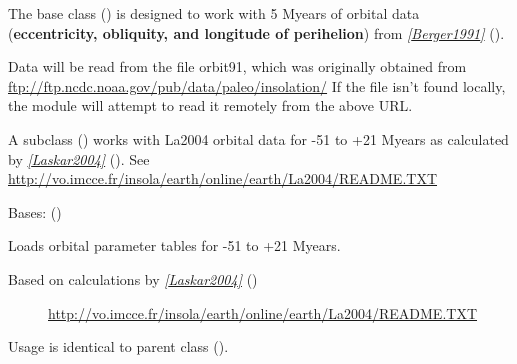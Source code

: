 \documentclass[a4paper,10pt,english]{sphinxmanual}
\begin{document}
The base class {\hyperref[api/climlab.solar:climlab.solar.orbital.OrbitalTable]{\emph{}}} () is designed to work with 5 Myears of orbital data
(\textbf{eccentricity, obliquity, and longitude of perihelion}) from \label{api/climlab.solar:id4}{\hyperref[references:berger1991]{\emph{{[}Berger1991{]}}}} ().

Data will be read from the file orbit91, which was originally obtained from
\href{ftp://ftp.ncdc.noaa.gov/pub/data/paleo/insolation/}{ftp://ftp.ncdc.noaa.gov/pub/data/paleo/insolation/}
If the file isn't found locally, the module will attempt to read it remotely
from the above URL.

A subclass {\hyperref[api/climlab.solar:climlab.solar.orbital.LongOrbitalTable]{\emph{}}} () works with La2004 orbital data for 
-51 to +21 Myears as calculated by \label{api/climlab.solar:id5}{\hyperref[references:laskar2004]{\emph{{[}Laskar2004{]}}}} ().
See \href{http://vo.imcce.fr/insola/earth/online/earth/La2004/README.TXT}{http://vo.imcce.fr/insola/earth/online/earth/La2004/README.TXT}

\begin{fulllineitems}
\label{api/climlab.solar:climlab.solar.orbital.LongOrbitalTable}
Bases: {\hyperref[api/climlab.solar:climlab.solar.orbital.OrbitalTable]{\emph{}}} ()

Loads orbital parameter tables for -51 to +21 Myears.
\begin{description}
\item[{Based on calculations by \label{api/climlab.solar:id6}{\hyperref[references:laskar2004]{\emph{{[}Laskar2004{]}}}} ()}] \leavevmode
\href{http://vo.imcce.fr/insola/earth/online/earth/La2004/README.TXT}{http://vo.imcce.fr/insola/earth/online/earth/La2004/README.TXT}

\end{description}

Usage is identical to parent class {\hyperref[api/climlab.solar:climlab.solar.orbital.OrbitalTable]{\emph{}}} ().

\end{fulllineitems}
\end{document}
